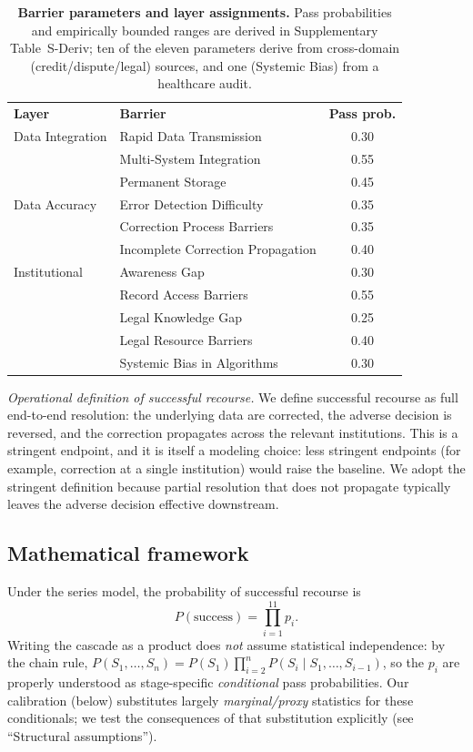 \documentclass[10pt,letterpaper]{article}
\newlength\savedwidth
\newcommand\thickhline{\noalign{\global\savedwidth\arrayrulewidth\global\arrayrulewidth 2pt}\hline\noalign{\global\arrayrulewidth\savedwidth}}
\begin{document}
\begin{table}[htbp]
\centering
\caption{{\bf Barrier parameters and layer assignments.} Pass probabilities and empirically bounded ranges are derived in Supplementary Table~S-Deriv; ten of the eleven parameters derive from cross-domain (credit/dispute/legal) sources, and one (Systemic Bias) from a healthcare audit.}
\label{table1}
\begin{tabular}{l l c}
\hline
\textbf{Layer} & \textbf{Barrier} & \textbf{Pass prob.} \\
\thickhline
Data Integration & Rapid Data Transmission & 0.30 \\
 & Multi-System Integration & 0.55 \\
 & Permanent Storage & 0.45 \\ \hline
Data Accuracy & Error Detection Difficulty & 0.35 \\
 & Correction Process Barriers & 0.35 \\
 & Incomplete Correction Propagation & 0.40 \\ \hline
Institutional & Awareness Gap & 0.30 \\
 & Record Access Barriers & 0.55 \\
 & Legal Knowledge Gap & 0.25 \\
 & Legal Resource Barriers & 0.40 \\
 & Systemic Bias in Algorithms & 0.30 \\
\hline
\end{tabular}
\end{table}

\emph{Operational definition of successful recourse.} We define successful recourse as full end-to-end resolution: the underlying data are corrected, the adverse decision is reversed, and the correction propagates across the relevant institutions. This is a stringent endpoint, and it is itself a modeling choice: less stringent endpoints (for example, correction at a single institution) would raise the baseline. We adopt the stringent definition because partial resolution that does not propagate typically leaves the adverse decision effective downstream.

\subsection*{Mathematical framework}
Under the series model, the probability of successful recourse is
\begin{equation}
P(\text{success}) = \prod_{i=1}^{11} p_i .
\end{equation}
Writing the cascade as a product does \emph{not} assume statistical independence: by the chain rule, $P(S_1,\dots,S_n)=P(S_1)\prod_{i=2}^{n}P(S_i\mid S_1,\dots,S_{i-1})$, so the $p_i$ are properly understood as stage-specific \emph{conditional} pass probabilities. Our calibration (below) substitutes largely \emph{marginal/proxy} statistics for these conditionals; we test the consequences of that substitution explicitly (see ``Structural assumptions'').
\end{document}
